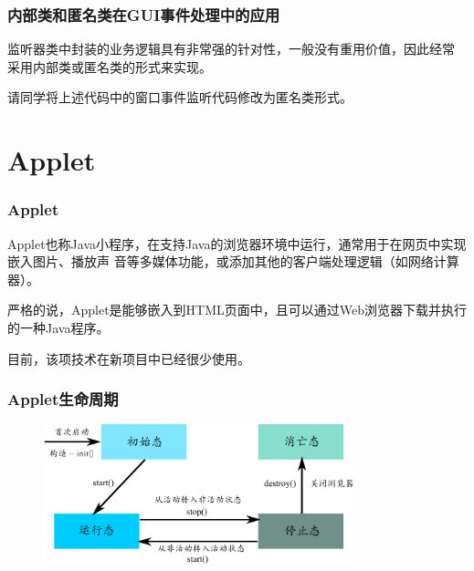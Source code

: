 \begin{frame}[fragile] %
  \frametitle{内部类和匿名类在GUI事件处理中的应用}

  监听器类中封装的业务逻辑具有非常强的针对性，一般没有重用价值，因此经常
  采用内部类或匿名类的形式来实现。


  
  {\kai\Red 请同学将上述代码中的窗口事件监听代码修改为匿名类形式。}

\end{frame}

\section{Applet}

\begin{frame}[fragile] %
  \frametitle{Applet}

  
  Applet也称Java小程序，在支持Java的浏览器环境中运行，通常用于在网页中实现嵌入图片、播放声
  音等多媒体功能，或添加其他的客户端处理逻辑（如网络计算器）。

  {\hei 严格的说，Applet是能够嵌入到HTML页面中，且可以通过Web浏览器下载并执行的一种Java程序。}

  目前，该项技术在新项目中已经很少使用。

\end{frame}

\begin{frame}[fragile] 
  \frametitle{Applet生命周期}

  \begin{figure}
    \centering
    \includegraphics[width=0.8\textwidth]{figures/fig05.pdf}
  \end{figure}
\end{frame}


